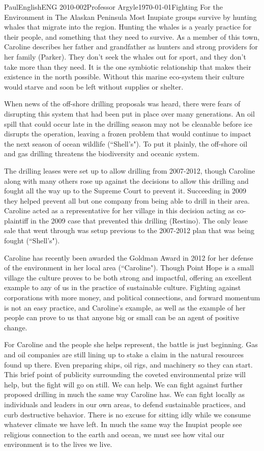 \documentclass[12pt,letterpaper]{article}
\begin{document}
\begin{mla}{Paul}{English}{ENG 2010-002}{Professor Argyle}{\today}{Fighting For the Environment in The Alaskan Peninsula}
Most Inupiate groups survive by hunting whales that migrate into the region. Hunting the whales is a yearly practice for their people, and something that they need to survive. As a member of this town, Caroline describes her father and grandfather as hunters and strong providers for her family (Parker). They don't seek the whales out for sport, and they don't take more than they need. It is the one symbiotic relationship that makes their existence in the north possible. Without this marine eco-system their culture would starve and soon be left without supplies or shelter.

When news of the off-shore drilling proposals was heard, there were fears of disrupting this system that had been put in place over many generations. An oil spill that could occur late in the drilling season may not be cleanable before ice disrupts the operation, leaving a frozen problem that would continue to impact the next season of ocean wildlife (``Shell's"). To put it plainly, the off-shore oil and gas drilling threatens the biodiversity and oceanic system.

The drilling leases were set up to allow drilling from 2007-2012, though Caroline along with many others rose up against the decisions to allow this drilling and fought all the way up to the Supreme Court to prevent it. Succeeding in 2009 they helped prevent all but one company from being able to drill in their area. Caroline acted as a representative for her village in this decision acting as co-plaintiff in the 2009 case that prevented this drilling (Restino). The only lease sale that went through was setup previous to the 2007-2012 plan that was being fought (``Shell's").

Caroline has recently been awarded the Goldman Award in 2012 for her defense of the environment in her local area (``Caroline"). Though Point Hope is a small village the culture proves to be both strong and impactful, offering an excellent example to any of us in the practice of sustainable culture. Fighting against corporations with more money, and political connections, and forward momentum is not an easy practice, and Caroline's example, as well as the example of her people can prove to us that anyone big or small can be an agent of positive change. 

For Caroline and the people she helps represent, the battle is just beginning. Gas and oil companies are still lining up to stake a claim in the natural resources found up there. Even preparing ships, oil rigs, and machinery so they can start. This brief point of publicity surrounding the coveted environmental prize will help, but the fight will go on still. We can help. We can fight against further proposed drilling in much the same way Caroline has. We can fight locally as individuals and leaders in our own areas, to defend sustainable practices, and curb destructive behavior. There is no excuse for sitting idly while we consume whatever climate we have left. In much the same way the Inupiat people see religious connection to the earth and ocean, we must see how vital our environment is to the lives we live.


\end{mla}
\end{document}
